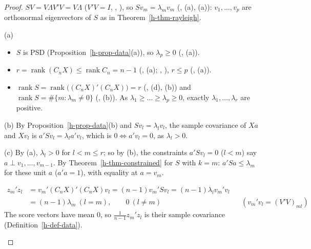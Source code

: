 \documentclass[12pt]{article}
\newcommand{\one}{\mathbf 1}
\DeclareMathOperator{\rank}{rank}
\theoremstyle{definition}
\newcommand{\boardtop}{\vspace*{-\abovedisplayskip}}
\begin{document}
\begin{proof}
\(SV=V\Lambda V'V=V\Lambda\) (\(V'V=I\), , ), so \(Sv_m=\lambda_mv_m\) (, (a),
(a)): \(v_1,\dots,v_p\) are orthonormal eigenvectors of \(S\) as in Theorem~\ref{h-thm-rayleigh}.

(a)
\begin{itemize}
\item \(S\) is PSD (Proposition~\ref{h-prop-data}(a)), so \(\lambda_p\geqslant0\) (, (a)).
\item \(r=\rank(C_nX)\leqslant\rank C_n=n-1\) (, (a); , ), \(r\leqslant p\) (,
(a)).
\item \(\rank S=\rank\bigl((C_nX)'(C_nX)\bigr)=r\) (, (d), (b)) and \(\rank S=\#\{m:\lambda_m\ne0\}\)
(, (b)). As \(\lambda_1\geqslant\dots\geqslant\lambda_p\geqslant0\), exactly \(\lambda_1,\dots,\lambda_r\) are
positive.
\end{itemize}
(b) By Proposition~\ref{h-prop-data}(b) and \(Sv_l=\lambda_lv_l\), the sample covariance of \(Xa\) and \(Xv_l\) is
\(a'Sv_l=\lambda_la'v_l\), which is \(0\iff a'v_l=0\), as \(\lambda_l>0\).

(c) By (a), \(\lambda_l>0\) for \(l<m\leqslant r\); so by (b), the constraints \(a'Sv_l=0\) (\(l<m\)) say
\(a\perp v_1,\dots,v_{m-1}\). By Theorem~\ref{h-thm-constrained} for \(S\) with \(k=m\): \(a'Sa\leqslant\lambda_m\) for
these unit \(a\) (\(a'a=1\)), with equality at \(a=v_m\).
\begin{board}[(d) Proposition~\ref{h-prop-data}(a); \(\frac1n\one'z_m=\frac1n\one'C_nXv_m=0\) (\lec{1}, \lit{Proposition~15}):]
\boardtop
\begin{align*}
z_m'z_l&=v_m'(C_nX)'(C_nX)v_l=(n-1)v_m'Sv_l=(n-1)\lambda_lv_m'v_l\\
&=(n-1)\lambda_m\ (l=m),\qquad0\ (l\ne m)&&(v_m'v_l=(V'V)_{ml})
\end{align*}
The score vectors have mean \(0\), so \(\frac1{n-1}z_m'z_l\) is their sample covariance (Definition~\ref{h-def-data}).
\end{board}
\nopagebreak
\end{proof}
\end{document}
